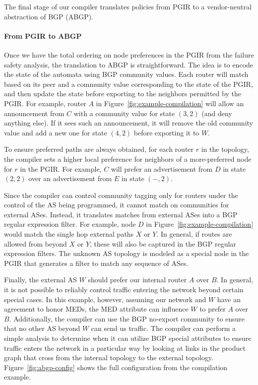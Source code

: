 \documentclass[10pt]{sigalternate052015}
\newcommand{\para}[1]{\paragraph*{\textbf{#1}}}
\begin{document}
The final stage of our compiler translates policies from PGIR to a vendor-neutral abstraction of BGP (ABGP).


\para{From PGIR to ABGP}

Once we have the total ordering on node preferences in the PGIR from the failure safety analysis, the translation to ABGP is straightforward. The idea is to encode the state of the automata using BGP community values. Each router will match based on its peer and a community value corresponding to the state of the PGIR, and then update the state before exporting to the neighbors permitted by the PGIR. For example, router $A$ in Figure~\ref{fig:example-compilation} will allow an announcement from $C$ with a community value for state $(3,2)$ (and deny anything else). If it sees such an announcement, it will remove the old community value and add a new one for state $(4,2)$ before exporting it to $W$.

To ensure preferred paths are always obtained, for each router $r$ in the topology, the compiler sets a higher local preference for neighbors of a more-preferred node for $r$ in the PGIR. For example, $C$ will prefer an advertisement from $D$ in state $(2,2)$ over an advertisement from $E$ in state $(-,2)$.

Since the compiler can control community tagging only for routers under the control of the AS being programmed, it cannot match on communities for external ASes. Instead, it translates matches from external ASes into a BGP regular expression filter. For example, node $D$ in Figure~\ref{fig:example-compilation} would match the single hop external paths $X$ or $Y$. In general, if routes are allowed from beyond $X$ or $Y$, these will also be captured in the BGP regular expression filters. The unknown AS topology is modeled as a special node in the PGIR that generates a filter to match any sequence of ASes.


Finally, the external AS $W$ should prefer our internal router $A$ over $B$. In general, it is not possible to reliably control traffic entering the network beyond certain special cases. In this example, however, assuming our network and $W$ have an agreement to honor MEDs, the MED attribute can influence $W$ to prefer $A$ over $B$. Additionally, the compiler can use the BGP no-export community to ensure that no other AS beyond $W$ can send us traffic. The compiler can perform a simple analysis to determine when it can utilize BGP special attributes to ensure traffic enters the network in a particular way by looking at links in the product graph that cross from the internal topology to the external topology.
Figure~\ref{fig:abgp-config} shows the full configuration from the compilation example.
\end{document}
